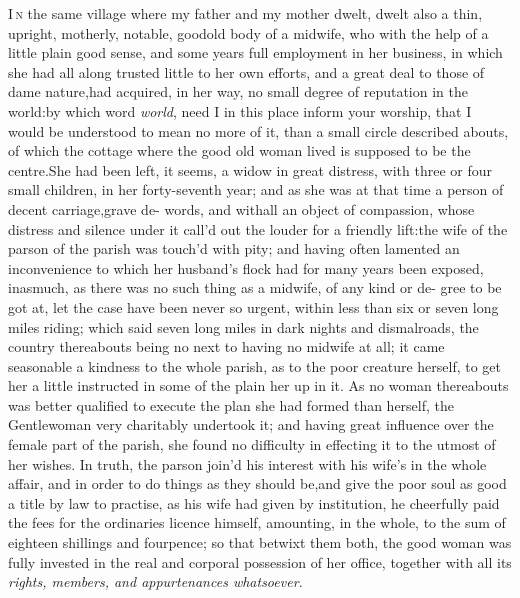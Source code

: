 \documentclass{article}
\begin{document}
\lettrine{I}{\,n} the same village where my father
and my mother dwelt, dwelt also a thin, upright, motherly, notable,
good\break old body of a midwife, who with the help of a little plain
good sense, and some years full employment in her business, in
which she had all along trusted little to her own efforts, and a
great deal to those of dame nature,\tsk  had acquired, in her way,
no small degree of reputation in the world:\tsk  by which word
\textit{world}, need I in this place inform your worship,
that I would be understood to mean no 
more of it, than a small circle described 
abouts, of which the cottage where the good old woman lived is supposed to be
the centre.\tsh  She had been left, it seems, a widow in great distress, with three or
four small children, in her forty-seventh year; and as she was at that time a person
of decent carriage,\tsk  grave de-\break
{}
words, and
withall an object of compassion, whose distress and silence under it call’d out the
louder for a friendly lift:\break the wife of the parson of the parish was touch’d with
pity; and having often la\-mented an inconvenience to which her husband’s flock had
for many years been exposed, inasmuch, as there was no such thing as a midwife, of
any kind or de- gree to be got at, let the case have been never so urgent, within
less than six or seven long miles riding; which said seven long miles in dark nights
and dismal\break roads, the country thereabouts being no\-\break{} next to having no midwife at
all; it came\break
{} seasonable a kindness to the
whole parish, as to the poor creature herself, to get her a little instructed in
some of the plain\break
{}
her up in it. As no
woman thereabouts was better qualified to execute the plan she had formed than
herself, the Gentle\-woman very charitably undertook it; and having great influence
over the female part of the parish, she found no difficulty in effecting it to the
utmost of her wishes. In truth, the parson join’d his interest with his wife’s in
the whole affair, and in order to do things as they should be,\break and give the poor
soul as good a title by law to practise, as his wife had given by institution,\tsk
he cheerfully paid the fees for the ordinaries licence himself, amounting, in the
whole, to the sum of eighteen shillings and fourpence; so that betwixt them both,
the good woman was fully invested in the real and corporal possession of her office,
together with all its \textit{rights, members, and appurtenances whatsoever.}
\end{document}

